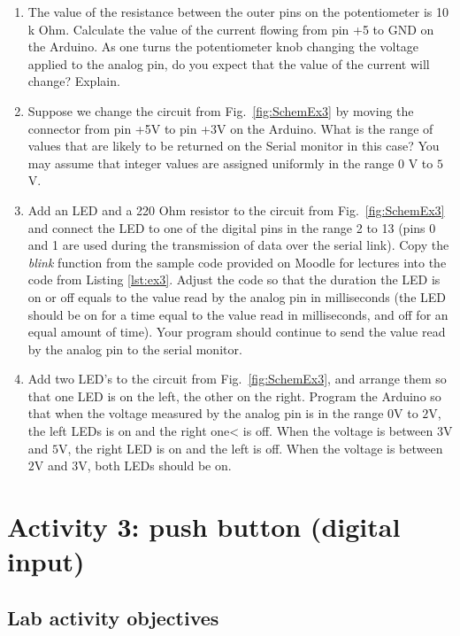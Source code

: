 \documentclass[12pt]{book}
\begin{document}
\begin{enumerate}[1.]
\item The value of the resistance between the outer pins on the
  potentiometer is 10 k Ohm. Calculate the value of the current
  flowing from pin +5 to GND on the Arduino. As one turns the
  potentiometer knob changing the voltage applied to the analog pin,
  do you expect that the value of the current will change? Explain.

\item Suppose we change the circuit from Fig.~\ref*{fig:SchemEx3} by
  moving the connector from pin +5V to pin +3V on the Arduino. What is
  the range of values that are likely to be returned on the Serial
  monitor in this case? You may assume that integer values are
  assigned uniformly in the range $0$ V to $5$ V.

\item\label{ex3:ch3} Add an LED and a 220 Ohm resistor to the circuit from
  Fig.~\ref*{fig:SchemEx3} and connect the LED to one of the digital
  pins in the range 2 to 13 (pins 0 and 1 are used during the
  transmission of data over the serial link). Copy the \emph{blink}
  function from the sample code provided on Moodle for lectures into
  the code from Listing \ref*{lst:ex3}. Adjust the code so that the
  duration the LED is on or off equals to the value read by the analog
  pin in milliseconds (the LED
  should be on for a time equal to the value read in milliseconds,
  and off for an equal amount of time). Your program should continue
  to send the value read by the analog pin to the serial monitor.

\item Add two LED's to the  circuit from
  Fig.~\ref*{fig:SchemEx3}, and arrange them so that one LED is on the
  left, the other on the right. Program the Arduino so that when the
  voltage measured by the analog pin is in the range $0$V to $2$V, the
  left LEDs is on and the right one< is off. When the voltage is between
  $3$V and $5$V, the right LED is on and the left is off. When the
  voltage is between $2$V and $3$V, both LEDs should be on.
\end{enumerate}



\chapter{Activity 3: push button (digital input)}\label{ch2.chap}

\section{Lab activity objectives}
\end{document}

